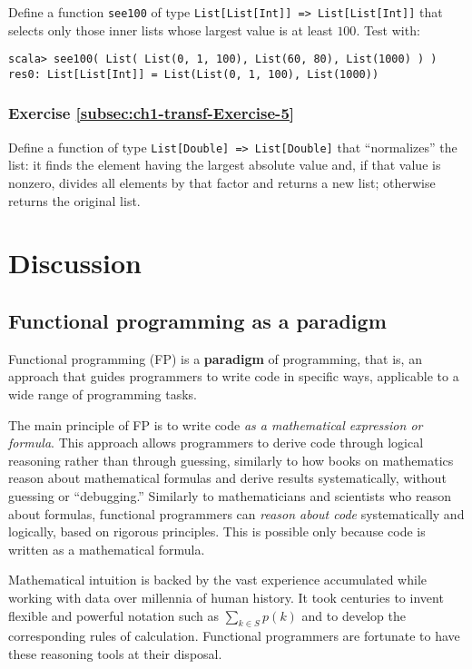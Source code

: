 Define a function \lstinline!see100! of type \texttt{}\lstinline!List[List[Int]] => List[List[Int]]!
that selects only those inner lists whose largest value is at least
$100$. Test with:
\begin{lstlisting}
scala> see100( List( List(0, 1, 100), List(60, 80), List(1000) ) )
res0: List[List[Int]] = List(List(0, 1, 100), List(1000))
\end{lstlisting}


\subsubsection{Exercise \label{subsec:ch1-transf-Exercise-5}\ref{subsec:ch1-transf-Exercise-5}}

Define a function of type \texttt{}\lstinline!List[Double] => List[Double]!
that \textsf{``}normalizes\textsf{''} the list: it finds the element having the largest
absolute value and, if that value is nonzero, divides all elements
by that factor and returns a new list; otherwise returns the original
list.

\section{Discussion}

\subsection{Functional programming as a paradigm}

Functional programming (FP) is a \textbf{paradigm}
of programming, \textemdash{} that is, an approach that guides programmers
to write code in specific ways, applicable to a wide range of programming
tasks.

The main principle of FP is to write code \emph{as a mathematical
expression or formula}. This approach allows programmers to derive
code through logical reasoning rather than through guessing, \textemdash{}
similarly to how books on mathematics reason about mathematical formulas
and derive results systematically, without guessing or \textsf{``}debugging.\textsf{''}
Similarly to mathematicians and scientists who reason about formulas,
functional programmers can \emph{reason about code} systematically
and logically, based on rigorous principles. This is possible only
because code is written as a mathematical formula.

Mathematical intuition is backed by the vast experience accumulated
while working with data over millennia of human history. It took centuries
to invent flexible and powerful notation such as $\sum_{k\in S}p(k)$
and to develop the corresponding rules of calculation. Functional
programmers are fortunate to have these reasoning tools at their disposal.

